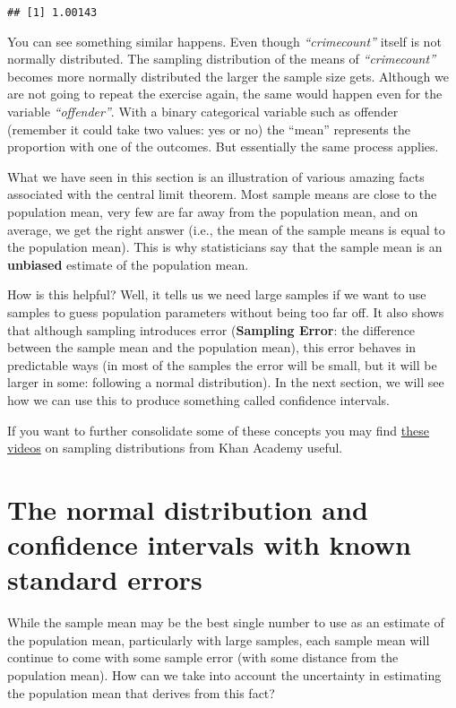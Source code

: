 \documentclass[
]{book}
\begin{document}
\begin{verbatim}
## [1] 1.00143
\end{verbatim}

You can see something similar happens. Even though \emph{``crimecount''} itself is not normally distributed. The sampling distribution of the means of \emph{``crimecount''} becomes more normally distributed the larger the sample size gets. Although we are not going to repeat the exercise again, the same would happen even for the variable \emph{``offender''}. With a binary categorical variable such as offender (remember it could take two values: yes or no) the ``mean'' represents the proportion with one of the outcomes. But essentially the same process applies.

What we have seen in this section is an illustration of various amazing facts associated with the central limit theorem. Most sample means are close to the population mean, very few are far away from the population mean, and on average, we get the right answer (i.e., the mean of the sample means is equal to the population mean). This is why statisticians say that the sample mean is an \textbf{unbiased} estimate of the population mean.

How is this helpful? Well, it tells us we need large samples if we want to use samples to guess population parameters without being too far off. It also shows that although sampling introduces error (\textbf{Sampling Error}: the difference between the sample mean and the population mean), this error behaves in predictable ways (in most of the samples the error will be small, but it will be larger in some: following a normal distribution). In the next section, we will see how we can use this to produce something called confidence intervals.

If you want to further consolidate some of these concepts you may find \href{https://www.khanacademy.org/math/probability/statistics-inferential/sampling_distribution/v/central-limit-theorem}{these videos} on sampling distributions from Khan Academy useful.

\section{The normal distribution and confidence intervals with known standard errors}\label{the-normal-distribution-and-confidence-intervals-with-known-standard-errors}

While the sample mean may be the best single number to use as an estimate of the population mean, particularly with large samples, each sample mean will continue to come with some sample error (with some distance from the population mean). How can we take into account the uncertainty in estimating the population mean that derives from this fact?
\end{document}
